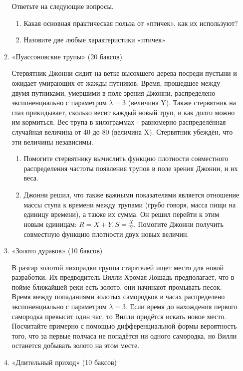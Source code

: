 \documentclass[11pt, a4paper]{article}
\theoremstyle{definition}
\begin{document}
\begin{enumerate}
\begin{enumerate}
Ответьте на следующие вопросы.
\begin{enumerate}
	\item Какая основная практическая польза от «птичек», как их используют?
	\item Назовите две любые характеристики «птичек»
\end{enumerate} 
\newpage
    \item «Пуассоновские трупы» (20 баксов)
    
    Стервятник Джонни сидит на ветке высохшего дерева посреди пустыни и ожидает умирающих от жажды путников. Время, прошедшее между двумя путниками, умершими в поле зрения Джонни, распределено экспоненциально с параметром $ \lambda = 3 $ (величина Y). Также стервятник на глаз прикидывает, сколько весит каждый новый труп, и как долго можно им кормиться.  Вес трупа в килограммах - равномерно распределённая случайная величина от 40 до 80 (величина X). Стервятник убеждён, что эти величины независимы.
    
    \begin{enumerate}
	\item Помогите стервятнику вычислить функцию плотности совместного распределения частоты появления трупов в поле зрения Джонни, и их веса.
	
	\item Джонни решил, что также важными показателями является отношение массы ступа к времени между трупами (грубо говоря, масса пищи на единицу времени), а также их сумма. Он решил перейти к этим новым единицам: $ R = X + Y, S = \frac{X}{Y} $. Помогите Джонни получить совместную функцию плотности двух новых величин.
    \end{enumerate}
    
    \item «Золото дураков» (10 баксов)
    
    В разгар золотой лихорадки группа старателей ищет место для новой разработки. Их предводитель Вилли Хромая Лошадь предполагает, что в пойме ближайшей реки есть золото. они начинают промывать песок. Время между попаданиями золотых самородков в часах распределено экспоненциально с параметром $\lambda = 3$. Если время до нахождения первого самородка превысит один час, то Вилли придётся искать новое место. Посчитайте примерно с помощью дифференциальной формы вероятность того, что за первые полчаса не попадётся ни одного самородка, но Вилли останется добывать золото на этом месте.
    
    
    \item  «Длительный приход» (10 баксов)
    

\end{enumerate}
\end{enumerate}
\end{document}
